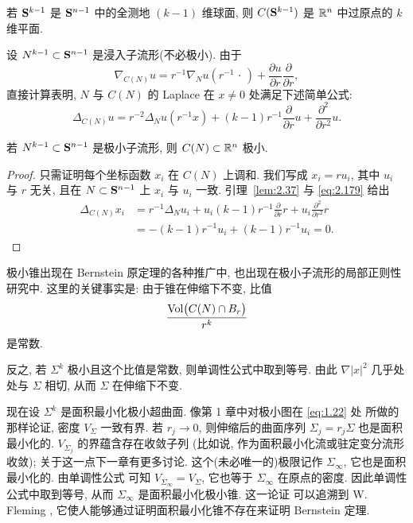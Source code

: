 \begin{example}
\label{ex:2.38}
若 $\mathbf{S}^{k-1}$ 是 $\mathbf{S}^{n-1}$ 中的全测地 $(k-1)$ 维球面, 则
$C(\mathbf{S}^{k-1})$ 是 $\mathbb{R}^n$ 中过原点的 $k$ 维平面.
\end{example}

设 $N^{k-1}\subset\mathbf{S}^{n-1}$ 是浸入子流形(不必极小). 由于
\begin{equation}
\nabla_{C(N)}u=r^{-1}\nabla_Nu(r^{-1}\,\cdot\,)
 +\frac{\partial u}{\partial r}\frac{\partial}{\partial r},
\label{eq:2.178}
\end{equation}
直接计算表明, $N$ 与 $C(N)$ 的 Laplace 在 $x\neq0$ 处满足下述简单公式:
\begin{equation}
\Delta_{C(N)}u=r^{-2}\Delta_Nu(r^{-1}x)
 +(k-1)r^{-1}\frac{\partial}{\partial r}u
 +\frac{\partial^{2}}{\partial r^{2}}u.
\label{eq:2.179}
\end{equation}

\begin{lemma}
\label{lem:2.39}
若 $N^{k-1}\subset\mathbf{S}^{n-1}$ 是极小子流形, 则 $C(N)\subset\mathbb{R}^n$ 极小.
\end{lemma}

\begin{proof}
只需证明每个坐标函数 $x_i$ 在 $C(N)$ 上调和. 我们写成 $x_i=ru_i$, 其中 $u_i$
与 $r$ 无关, 且在 $N\subset\mathbf{S}^{n-1}$ 上 $x_i$ 与 $u_i$ 一致. 引理~\ref{lem:2.37}
与 \eqref{eq:2.179} 给出
\begin{equation}
\begin{aligned}
\Delta_{C(N)}x_i
&=r^{-1}\Delta_Nu_i+u_i(k-1)r^{-1}\frac{\partial}{\partial r}r
 +u_i\frac{\partial^{2}}{\partial r^{2}}r\\
&=-(k-1)r^{-1}u_i+(k-1)r^{-1}u_i=0.
\end{aligned}
\label{eq:2.180}
\end{equation}
\end{proof}

极小锥出现在 Bernstein 原定理的各种推广中, 也出现在极小子流形的局部正则性
研究中. 这里的关键事实是: 由于锥在伸缩下不变, 比值
\begin{equation}
\frac{\operatorname{Vol}\bigl(C(N)\cap B_r\bigr)}{r^{k}}
\label{eq:2.181}
\end{equation}
是常数.

反之, 若 $\Sigma^{k}$ 极小且这个比值是常数, 则单调性公式中取到等号. 由此
$\nabla|x|^{2}$ 几乎处处与 $\Sigma$ 相切, 从而 $\Sigma$ 在伸缩下不变.

现在设 $\Sigma^{k}$ 是面积最小化极小超曲面. 像第 1 章中对极小图在 \eqref{eq:1.22} 处
所做的那样论证, 密度 $V_{\Sigma}$ 一致有界. 若 $r_j\to0$, 则伸缩后的曲面序列
$\Sigma_j=r_j\Sigma$ 也是面积最小化的. $V_{\Sigma_j}$ 的界蕴含存在收敛子列
(比如说, 作为面积最小化流或驻定变分流形收敛); 关于这一点下一章有更多讨论.
这个(未必唯一的)极限记作 $\Sigma_\infty$, 它也是面积最小化的. 由单调性公式
可知 $V_{\Sigma_\infty}=V_{\Sigma}$, 它也等于 $\Sigma_\infty$ 在原点的密度.
因此单调性公式中取到等号, 从而 $\Sigma_\infty$ 是面积最小化极小锥. 这一论证
可以追溯到 W. Fleming \cite{Fl}, 它使人能够通过证明面积最小化锥不存在来证明
Bernstein 定理.


